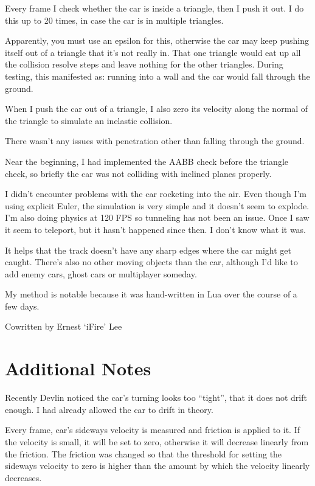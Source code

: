 \documentclass[]{book}
\begin{document}
Every frame I check whether the car is inside a triangle, then I push it
out. I do this up to 20 times, in case the car is in multiple triangles.

Apparently, you must use an epsilon for this, otherwise the car may keep
pushing itself out of a triangle that it's not really in. That one
triangle would eat up all the collision resolve steps and leave nothing
for the other triangles. During testing, this manifested as: running
into a wall and the car would fall through the ground.

When I push the car out of a triangle, I also zero its velocity along
the normal of the triangle to simulate an inelastic collision.

There wasn't any issues with penetration other than falling through the
ground.

Near the beginning, I had implemented the AABB check before the triangle
check, so briefly the car was not colliding with inclined planes
properly.

I didn't encounter problems with the car rocketing into the air. Even
though I'm using explicit Euler, the simulation is very simple and it
doesn't seem to explode. I'm also doing physics at 120 FPS so tunneling
has not been an issue. Once I saw it seem to teleport, but it hasn't
happened since then. I don't know what it was.

It helps that the track doesn't have any sharp edges where the car might
get caught. There's also no other moving objects than the car, although
I'd like to add enemy cars, ghost cars or multiplayer someday.

My method is notable because it was hand-written in Lua over the course
of a few days.

Cowritten by Ernest `iFire' Lee

\section{Additional Notes}\label{additional-notes}

Recently Devlin noticed the car's turning looks too ``tight'', that it
does not drift enough. I had already allowed the car to drift in theory.

Every frame, car's sideways velocity is measured and friction is applied
to it. If the velocity is small, it will be set to zero, otherwise it
will decrease linearly from the friction. The friction was changed so
that the threshold for setting the sideways velocity to zero is higher
than the amount by which the velocity linearly decreases.
\end{document}
